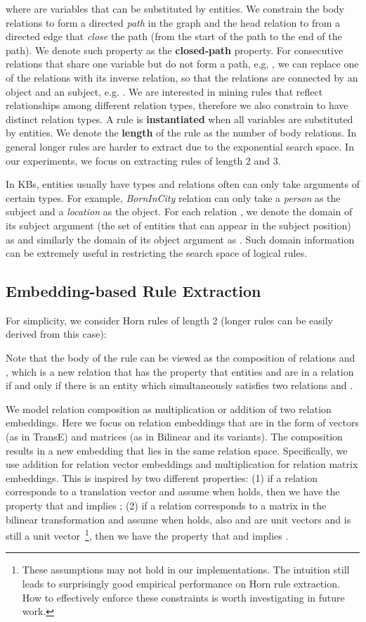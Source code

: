\documentclass{article} \usepackage{iclr2015,times}
\begin{document}
where  are variables that can be substituted by entities. We constrain the body relations  to form a directed \textit{path} in the graph and the head relation  to from a directed edge that \textit{close} the path (from the start of the path to the end of the path). We denote such property as the \textbf{closed-path} property. For consecutive relations that share one variable but do not form a path, e,g, , we can replace one of the relations with its inverse relation, so that the relations are connected by an object and an subject, e.g. . We are interested in mining rules that reflect relationships among different relation types, therefore we also constrain  to have distinct relation types. A rule is \textbf{instantiated} when all variables are substituted by entities. We denote the \textbf{length} of the rule as the number of body relations. In general longer rules are harder to extract due to the exponential search space. In our experiments, we focus on extracting rules of length 2 and 3.

In KBs, entities usually have types and relations often can only take arguments of certain types. For example, \textit{BornInCity} relation can only take a \textit{person} as the subject and a \textit{location} as the object. For each relation , we denote the domain of its subject argument (the set of entities that can appear in the subject position) as  and similarly the domain of its object argument as . Such domain information can be extremely useful in restricting the search space of logical rules.

\subsection{Embedding-based Rule Extraction}
\label{sec:embedrule}
For simplicity, we consider Horn rules of length 2 (longer rules can be easily derived from this case):

Note that the body of the rule can be viewed as the composition of relations  and , which is a new relation that has the property that entities  and  are in a relation if and only if there is an entity  which simultaneously satisfies two relations  and . 

We model relation composition as multiplication or addition of two relation embeddings. Here we focus on relation embeddings that are in the form of vectors (as in {\sc TransE}) and matrices (as in {\sc Bilinear} and its variants). The composition results in a new embedding that lies in the same relation space. Specifically, we use addition for relation vector embeddings and multiplication for relation matrix embeddings. This is inspired by two different properties: (1) if a relation corresponds to a translation vector  and assume  when  holds, then we have the property that  and  implies ; (2) if a relation corresponds to a matrix  in the bilinear transformation and assume  when  holds, also  and  are unit vectors and  is still a unit vector~\footnote{These assumptions may not hold in our implementations. The intuition still leads to surprisingly good empirical performance on Horn rule extraction. How to effectively enforce these constraints is worth investigating in future work.}, then we have the property that  and  implies .
\end{document}
